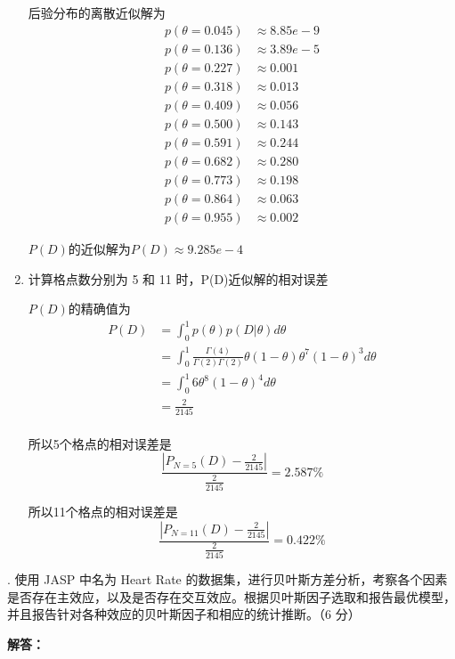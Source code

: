 \documentclass[stu,12pt,floatsintext]{apa7} %
\begin{document}
\begin{enumerate}[itemsep=2pt,topsep=0pt,parsep=0pt,label=(\alph*)]
    后验分布的离散近似解为
    \begin{align*}
        p(\theta = 0.045) & \approx 8.85e-9\\
        p(\theta = 0.136) & \approx 3.89e-5\\
        p(\theta = 0.227) & \approx 0.001\\
        p(\theta = 0.318) & \approx 0.013\\
        p(\theta = 0.409) & \approx 0.056\\
        p(\theta = 0.500) & \approx 0.143\\
        p(\theta = 0.591) & \approx 0.244\\
        p(\theta = 0.682) & \approx 0.280\\
        p(\theta = 0.773) & \approx 0.198\\
        p(\theta = 0.864) & \approx 0.063\\
        p(\theta = 0.955) & \approx 0.002
    \end{align*}

    \(P(D)\)的近似解为\(P(D) \approx 9.285e-4\)

    \item 计算格点数分别为 5 和 11 时，P(D)近似解的相对误差
    
    \(P(D)\)的精确值为
    \begin{align*}
        P(D) & = \int_0^1 p(\theta)p(D|\theta)d\theta\\
        & = \int_0^1 \frac{\Gamma(4)}{\Gamma(2)\Gamma(2)} \theta(1-\theta) \theta^7 (1-\theta)^3 d\theta\\
        & = \int_0^1 6 \theta^8 (1-\theta)^4 d\theta\\
        & = \frac{2}{2145}
    \end{align*}\\

    所以5个格点的相对误差是
    \[
    \frac{\left|P_{N=5}(D) - \frac{2}{2145}\right|}{\frac{2}{2145}} = 2.587\%
    \]

    所以11个格点的相对误差是
    \[
    \frac{\left|P_{N=11}(D) - \frac{2}{2145}\right|}{\frac{2}{2145}} = 0.422\%
    \]

\end{enumerate}

. {\heiti 使用 JASP 中名为 Heart Rate 的数据集，进行贝叶斯方差分析，考察各个因素是否存在主效应，以及是否存在交互效应。根据贝叶斯因子选取和报告最优模型，并且报告针对各种效应的贝叶斯因子和相应的统计推断。（6 分）}

\noindent \textbf{解答：}
\end{document}
